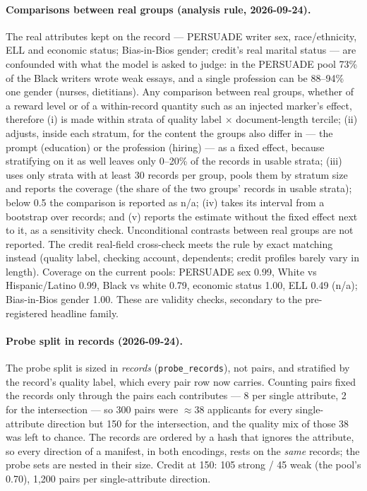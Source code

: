\paragraph{Comparisons between real groups (analysis rule, 2026-09-24).} The real attributes kept on the record
--- PERSUADE writer sex, race/ethnicity, ELL and economic status; Bias-in-Bios gender; credit's real marital
status --- are confounded with what the model is asked to judge: in the PERSUADE pool 73\% of the Black writers
wrote weak essays, and a single profession can be 88--94\% one gender (nurses, dietitians). Any comparison between
real groups, whether of a reward level or of a within-record quantity such as an injected marker's effect,
therefore
(i) is made within strata of quality label $\times$ document-length tercile;
(ii) adjusts, inside each stratum, for the content the groups also differ in --- the prompt (education) or the
profession (hiring) --- as a fixed effect, because stratifying on it as well leaves only 0--20\% of the records in
usable strata;
(iii) uses only strata with at least 30 records per group, pools them by stratum size and reports the coverage
(the share of the two groups' records in usable strata); below 0.5 the comparison is reported as n/a;
(iv) takes its interval from a bootstrap over records; and
(v) reports the estimate without the fixed effect next to it, as a sensitivity check.
Unconditional contrasts between real groups are not reported. The credit real-field cross-check meets the rule
by exact matching instead (quality label, checking account, dependents; credit profiles barely vary in length).
Coverage on the current pools: PERSUADE sex 0.99, White vs Hispanic/Latino 0.99, Black vs white 0.79, economic
status 1.00, ELL 0.49 (n/a); Bias-in-Bios gender 1.00. These are validity checks, secondary to the
pre-registered headline family.
\paragraph{Probe split in records (2026-09-24).} The probe split is sized in \emph{records}
(\texttt{probe\_records}), not pairs, and stratified by the record's quality label, which every pair row now
carries. Counting pairs fixed the records only through the pairs each contributes --- 8 per single attribute,
2 for the intersection --- so 300 pairs were $\approx$38 applicants for every single-attribute direction but
150 for the intersection, and the quality mix of those 38 was left to chance. The records are ordered by a
hash that ignores the attribute, so every direction of a manifest, in both encodings, rests on the \emph{same}
records; the probe sets are nested in their size. Credit at 150: 105 strong / 45 weak (the pool's 0.70),
1{,}200 pairs per single-attribute direction.

